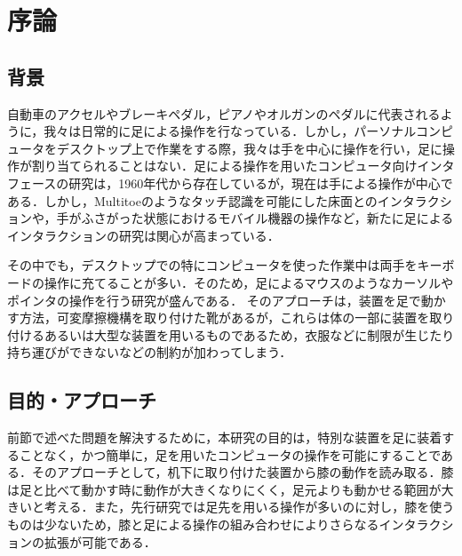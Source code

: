 \chapter{序論}

\section{背景}
自動車のアクセルやブレーキペダル，ピアノやオルガンのペダルに代表されるように，我々は日常的に足による操作を行なっている．しかし，パーソナルコンピュータをデスクトップ上で作業をする際，我々は手を中心に操作を行い，足に操作が割り当てられることはない．足による操作を用いたコンピュータ向けインタフェースの研究は，1960年代から存在している\cite{1698228}が，現在は手による操作が中心である．しかし，Multitoe\cite{Augsten:2010:MHI:1866029.1866064}のようなタッチ認識を可能にした床面とのインタラクションや，手がふさがった状態におけるモバイル機器の操作\cite{Fan:2017:ESF:3123021.3123043, okumura_2011}など，新たに足によるインタラクションの研究は関心が高まっている．\par
その中でも，デスクトップでの特にコンピュータを使った作業中は両手をキーボードの操作に充てることが多い．そのため，足によるマウスのようなカーソルやポインタの操作を行う研究が盛んである．
そのアプローチは，装置を足で動かす方法\cite{Pearson:1986:MMD:22627.22392, Pearson:1988:EET:49108.1046356}，可変摩擦機構を取り付けた靴\cite{Horodniczy:2017:FHE:3025453.3025625}があるが，これらは体の一部に装置を取り付けるあるいは大型な装置を用いるものであるため，衣服などに制限が生じたり持ち運びができないなどの制約が加わってしまう．



\section{目的・アプローチ}
前節で述べた問題を解決するために，本研究の目的は，特別な装置を足に装着することなく，かつ簡単に，足を用いたコンピュータの操作を可能にすることである．そのアプローチとして，机下に取り付けた装置から膝の動作を読み取る．膝は足と比べて動かす時に動作が大きくなりにくく，足元よりも動かせる範囲が大きいと考える．また，先行研究では足先を用いる操作が多いのに対し，膝を使うものは少ない\cite{1698228}ため，膝と足による操作の組み合わせによりさらなるインタラクションの拡張が可能である．


